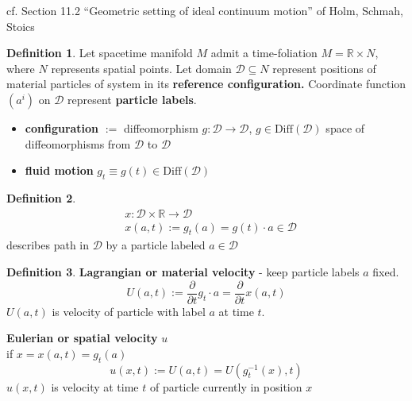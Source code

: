 \documentclass[twoside,landscape,10pt]{amsart}
\theoremstyle{plain}
\theoremstyle{definition}
\newtheorem{definition}{Definition}
\theoremstyle{remark}
\theoremstyle{remark}
\begin{document}
\begin{multicols*}{2}
cf. Section 11.2 ``Geometric setting of ideal continuum motion'' of Holm, Schmah, Stoics \cite{DHolmTSchmahCStoica2009}
\begin{definition}
  Let spacetime manifold $M$ admit a time-foliation $M = \mathbb{R} \times N$, where $N$ represents spatial points. 
Let domain $\mathcal{D} \subseteq N$ represent positions of material particles of system in its \textbf{reference configuration.} Coordinate function $(a^i)$ on $\mathcal{D}$ represent \textbf{particle labels}.  

\begin{itemize}
  \item \textbf{configuration} $:= $ diffeomorphism $g: \mathcal{D} \to \mathcal{D}$, $g\in \text{Diff}(\mathcal{D})$ space of diffeomorphisms from $\mathcal{D}$ to $\mathcal{D}$ 
\item \textbf{fluid motion} $g_t \equiv g(t) \in \text{Diff}(\mathcal{D})$
\end{itemize}  
\end{definition}

\begin{definition}
  \begin{equation}
    \begin{aligned}
      & x: \mathcal{D} \times \mathbb{R} \to \mathcal{D} \\ 
      & x(a,t) := g_t(a) = g(t)\cdot a \in \mathcal{D}      
\end{aligned}
\end{equation} describes path in $\mathcal{D}$ by a particle labeled $a \in \mathcal{D}$
\end{definition}

\begin{definition}
\textbf{Lagrangian or material velocity} - keep particle labels $a$ fixed.  
\begin{equation}
  U(a,t) := \frac{ \partial }{ \partial t} g_t \cdot a = \frac{ \partial }{ \partial t} x(a,t)
\end{equation}
$U(a,t)$ is velocity of particle with label $a$ at time $t$.  


\textbf{Eulerian or spatial velocity } $u$ \\
\phantom{\quad \, } if $x = x(a,t) = g_t(a)$ 
\begin{equation}
u(x,t) := U(a,t) = U(g^{-1}_t(x),t)
\end{equation}
$u(x,t)$ is velocity at time $t$ of particle currently in position $x$
\end{definition}


\end{multicols*}
\end{document}
